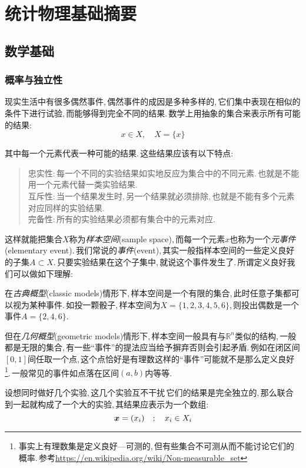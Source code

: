\chapter{统计物理基础摘要}

\section{数学基础}


\subsection{概率与独立性}
现实生活中有很多偶然事件,\,偶然事件的成因是多种多样的,\,它们集中表现在相似的条件下进行试验,\,而能够得到完全不同的结果.\,数学上用抽象的集合来表示所有可能的结果:
\[x\in X,\quad X=\{x\}\]

其中每一个元素代表一种可能的结果.\,这些结果应该有以下特点:
\begin{quote}
{\hei 忠实性}:\,每一个不同的实验结果如实地反应为集合中的不同元素.\,也就是不能用一个元素代替一类实验结果.\\
{\hei 互斥性}:\,当一个结果发生时,\,另一个结果就必须排除,\,也就是不能有多个元素对应同样的实验结果.\\
{\hei 完备性}:\,所有的实验结果必须都有集合中的元素对应.
\end{quote}

这样就能把集合\(X\)称为\emph{样本空间}(sample space),\,而每一个元素\(x\)也称为一个\emph{元事件}(elementary event).\,我们常说的\emph{事件}(event),\,其实一般指样本空间的一些定义良好的子集\(A\subset X\).\,只要实验结果在这个子集中,\,就说这个事件发生了.\,所谓定义良好我们可以做如下理解:

在\emph{古典概型}(classic models)情形下,\,样本空间是一个有限的集合,\,此时任意子集都可以视为某种事件.\,如投一颗骰子,\,样本空间为\(X=\{1,2,3,4,5,6\}\),\,则投出偶数是一个事件\(A=\{2,4,6\}\).

但在\emph{几何概型}(geometric models)情形下,\,样本空间一般具有与\(\mathbb{R}^n\)类似的结构,\,一般都是无限的集合,\,有一些``事件''的提法应当给予摒弃否则会引起矛盾.\,例如在闭区间\([0,1]\)间任取一个点,\,这个点恰好是有理数这样的``事件''可能就不是那么定义良好\footnote{事实上有理数集是定义良好---可测的,\,但有些集合不可测从而不能讨论它们的概率.\,参考\url{https://en.wikipedia.org/wiki/Non-measurable_set}}.\,一般常见的事件如点落在区间\((a,b)\)内等等.

设想同时做好几个实验,\,这几个实验互不干扰\,它们的结果是完全独立的,\,那么联合到一起就构成了一个大的实验,\,其结果应表示为一个数组:
\[\boldsymbol{x}=(x_i)\quad ;\quad x_i\in X_i\]


